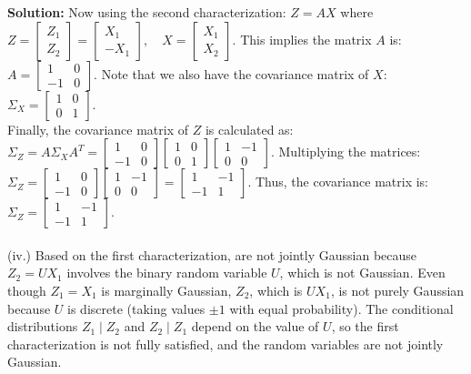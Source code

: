 \documentclass{article}
\newenvironment{solution}{\color{blue} \smallskip \textbf{Solution:}}{}
\begin{document}
\begin{enumerate}[(a)]
\begin{solution}
Now using the second characterization: \(Z = A X\) where \(Z = \begin{bmatrix} Z_1 \\ Z_2 \end{bmatrix} = \begin{bmatrix} X_1 \\ -X_1 \end{bmatrix}, \quad X = \begin{bmatrix} X_1 \\ X_2 \end{bmatrix}\). This implies the matrix \(A\) is: \(A = \begin{bmatrix} 1 & 0 \\ -1 & 0 \end{bmatrix}\). Note that we also have the covariance matrix of \(X\): \(\Sigma_X = \begin{bmatrix} 1 & 0 \\ 0 & 1 \end{bmatrix}\).\\

Finally, the covariance matrix of \(Z\) is calculated as: \(\Sigma_Z = A \Sigma_X A^T = \begin{bmatrix} 1 & 0 \\ -1 & 0 \end{bmatrix} \begin{bmatrix} 1 & 0 \\ 0 & 1 \end{bmatrix} \begin{bmatrix} 1 & -1 \\ 0 & 0 \end{bmatrix}\). Multiplying the matrices: \(\Sigma_Z = \begin{bmatrix} 1 & 0 \\ -1 & 0 \end{bmatrix} \begin{bmatrix} 1 & -1 \\ 0 & 0 \end{bmatrix} = \begin{bmatrix} 1 & -1 \\ -1 & 1 \end{bmatrix}\). Thus, the covariance matrix is: \(\Sigma_Z = \begin{bmatrix} 1 & -1 \\ -1 & 1 \end{bmatrix}\).\\\\

(iv.)
Based on the first characterization,  are not jointly Gaussian because \(Z_2 = U X_1\) involves the binary random variable \(U\), which is not Gaussian. Even though \(Z_1 = X_1\) is marginally Gaussian, \(Z_2\), which is \(U X_1\), is not purely Gaussian because \(U\) is discrete (taking values \(\pm 1\) with equal probability). The conditional distributions \(Z_1 \mid Z_2\) and \(Z_2 \mid Z_1\) depend on the value of \(U\), so the first characterization is not fully satisfied, and the random variables are not jointly Gaussian.\\


\end{solution}
\end{enumerate}
\end{document}
